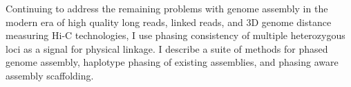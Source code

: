 \documentclass[11pt]{article}
\begin{document}
\par{
Continuing to address the remaining problems with genome assembly in the modern era of high quality long reads, linked reads, and 3D genome distance measuring Hi-C technologies, I use phasing consistency of multiple heterozygous loci as a signal for physical linkage. I describe a suite of methods for phased genome assembly, haplotype phasing of existing assemblies, and phasing aware assembly scaffolding.  
}
\end{document}
